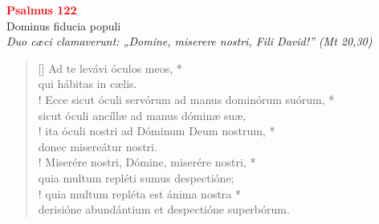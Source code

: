 


\def\greinitialformat#1{%
{\fontsize{39}{39}\selectfont #1}%
}




\vspace{0.3cm}
\begin{center}
 \textcolor{red}{\large \bf Psalmus 122}\\
Dominus fiducia populi\\
\textit{\small Duo cæci clamaverunt: „Domine, miserere nostri, Fili David!” (Mt 20,30)}
\end{center}
\begin{verse}[\versewidth]
Ad te levávi óculos meos, *\\
qui hábitas in cælis.\\!
\vin Ecce sicut \verselinebreak óculi servórum ad manus dominórum suórum, *\\
\vin sicut óculi ancíllæ ad manus dóminæ suæ,\\!
ita óculi nostri ad Dóminum Deum nostrum, *\\
donec misereátur nostri.\\!
\vin Miserére nostri, Dómine, miserére nostri, *\\
\vin quia multum repléti sumus despectióne;\\!
quia multum repléta est ánima nostra *\\
derisióne abundántium et despectióne superbórum.\\
\end{verse}
\vspace{1cm}


